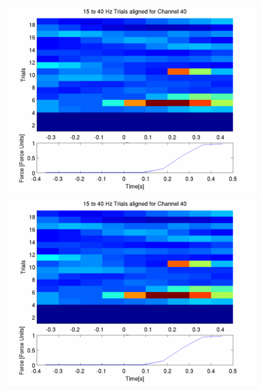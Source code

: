 \documentclass[12pt]{article}
\begin{document}
\includegraphics[scale=0.2]{noCAR/plot_3_aligned_trials.png}
\includegraphics[scale=0.2]{WithCAR/plot_3_aligned_trials.png}
\end{document}
